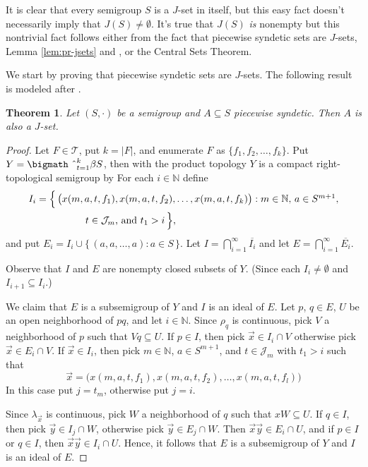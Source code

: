 \documentclass[12pt,showtrims]{memoir}
\theoremstyle{plain}
\newtheorem{thm}{Theorem}[section]
\theoremstyle{definition}
\newcommand{\bbN}{\mathbb{N}}
\newcommand{\calJ}{\mathcal{J}}
\newcommand{\calT}{\mathcal{T}}
\newcommand{\bigtimes}{\hbox{\bigmath \char'2}}
\begin{document}
It is clear that every semigroup $S$ is a $J$-set in itself, but this easy fact doesn't necessarily imply that $J(S) \ne \emptyset$.
It's true that $J(S)$ \emph{is} nonempty but this nontrivial fact follows either from the fact that piecewise syndetic sets are $J$-sets, Lemma \ref{lem:pr-jsets} and \cite[Theorem 3.11]{Hindman:1998fk}, or the Central Sets Theorem. 

We start by proving that piecewise syndetic sets are $J$-sets.
The following result is modeled after \cite[Theorems 14.1 and 14.7]{Hindman:1998fk}. 

\begin{thm}
  Let $(S, \cdot)$ be a semigroup and $A \subseteq S$ piecewise syndetic.
  Then $A$ is also a $J$-set.
\end{thm}
\begin{proof}
  Let $F \in \calT$, put $k = |F|$, and enumerate $F$ as $\{f_1, f_2, \ldots, f_k\}$.
  Put $Y = \bigtimes_{t=1}^k \beta S$, then with the product topology $Y$ is a compact right-topological semigroup by \cite[Theorem 2.22]{Hindman:1998fk}
  For each $i \in \bbN$ define
  \begin{align*}
    I_i &= \Bigl\{\, \bigl( x(m, a, t, f_1), x(m, a, t, f_2), \ldots,
    x(m, a, t, f_k) \bigr) : \mbox{$m \in \bbN$, $a \in S^{m+1}$,} \\
    &\hspace{5em} \mbox{$t \in \calJ_m$, and $t_1 > i$}
    \,\Bigr\},
  \end{align*}
  and put $E_i = I_i \cup \{\, (a, a, \ldots, a) : a \in S \,\}$.
  Let $I = \bigcap_{i=1}^\infty \overline{I_i}$ and let $E = \bigcap_{i=1}^\infty \overline{E_i}$.

  Observe that $I$ and $E$ are nonempty closed subsets of $Y$.
  (Since each $I_i \ne \emptyset$ and $I_{i+1} \subseteq I_i$.)

  We claim that $E$ is a subsemigroup of $Y$ and $I$ is an ideal of $E$.
  Let $p$, $q \in E$, $U$ be an open neighborhood of $pq$, and let $i \in \bbN$. 
  Since $\rho_q$ is continuous, pick $V$ a neighborhood of $p$ such that $Vq \subseteq U$. 
  If $p \in I$, then pick $\vec{x} \in I_i \cap V$ otherwise pick $\vec{x} \in E_i \cap V$.
  If $\vec{x} \in I_i$, then pick $m \in \bbN$, $a \in S^{m+1}$, and $t \in \calJ_m$ with $t_1 > i$ such that
  \[
    \vec{x} = \bigl( x(m, a, t, f_1), x(m, a, t, f_2), \ldots, x(m,
    a, t, f_l) \bigr)
  \]
  In this case put $j = t_m$, otherwise put $j=i$. 

  Since $\lambda_{\vec{x}}$ is continuous, pick $W$ a neighborhood of $q$ such that $xW \subseteq U$. 
  If $q \in I$, then pick $\vec{y} \in I_j \cap W$, otherwise pick $\vec{y} \in E_j \cap W$.
  Then $\vec{x} \vec{y} \in E_i \cap U$, and if $p \in I$ or $q \in I$, then $\vec{x} \vec{y} \in I_i \cap U$. 
  Hence, it follows that $E$ is a subsemigroup of $Y$ and $I$ is an ideal of $E$.


\end{proof}
\end{document}
